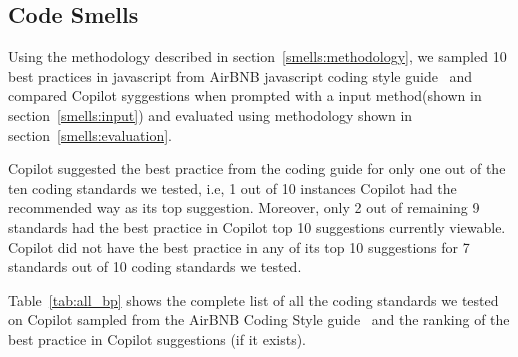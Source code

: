 \subsection{Code Smells}
\label{smells}
Using the methodology described in section~\ref{smells:methodology}, we sampled 10 best practices in javascript from AirBNB javascript coding style guide~\cite{airbnb_code} and compared Copilot syggestions when prompted with a input method(shown in section~\ref{smells:input}) and evaluated using methodology shown in section~\ref{smells:evaluation}. 

Copilot suggested the best practice from the coding guide for only one out of the ten coding standards we tested, i.e, 1 out of 10 instances Copilot had the recommended way as its top suggestion. Moreover, only 2 out of remaining 9 standards had the best practice in Copilot top 10 suggestions currently viewable. Copilot did not have the best practice in any of its top 10 suggestions for 7 standards out of 10 coding standards we tested.


Table~\ref{tab:all_bp} shows the complete list of all the coding standards we tested on Copilot sampled from the AirBNB Coding Style guide~\cite{airbnb_code} and the ranking of the best practice in Copilot suggestions (if it exists).

